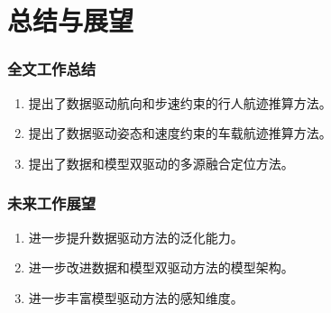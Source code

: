 

\section{总结与展望}

\begin{frame}

	\frametitle{全文工作总结}
	
	\begin{enumerate}
	
		\item 提出了数据驱动航向和步速约束的行人航迹推算方法。
		
		\item 提出了数据驱动姿态和速度约束的车载航迹推算方法。
		
		\item 提出了数据和模型双驱动的多源融合定位方法。

	\end{enumerate}
	
\end{frame}


\begin{frame}

	\frametitle{未来工作展望}
	
	\begin{enumerate}
	
		\item 进一步提升数据驱动方法的泛化能力。
		
		\item 进一步改进数据和模型双驱动方法的模型架构。
		
		\item 进一步丰富模型驱动方法的感知维度。

	\end{enumerate}
	
\end{frame}

